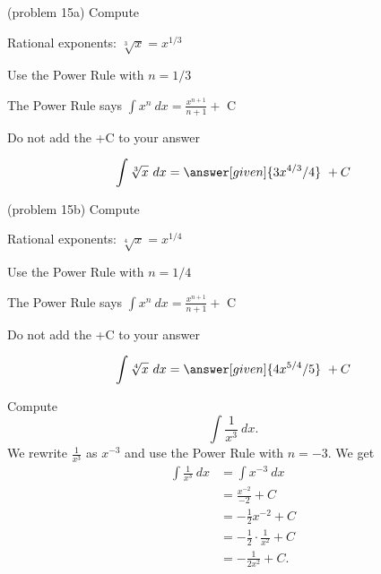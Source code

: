 \documentclass{ximera}
\begin{document}
\begin{problem}(problem 15a)
Compute 

\begin{hint}
Rational exponents: $\sqrt[3]x = x^{1/3}$
\end{hint}
\begin{hint}
Use the Power Rule with $n=1/3$
\end{hint}
\begin{hint}
The Power Rule says $\int x^n \ dx = \frac{x^{n+1}}{n+1} +$ C
\end{hint}
\begin{hint}
\begin{center}
Do not add the +C to your answer
\end{center}
\end{hint}

\[
\int \sqrt[3]x \ dx =
\answer[given]{3x^{4/3} /4} \ + C
\]
\end{problem}


\begin{problem}(problem 15b)
Compute 

\begin{hint}
Rational exponents: $\sqrt[4]x = x^{1/4}$
\end{hint}
\begin{hint}
Use the Power Rule with $n=1/4$
\end{hint}
\begin{hint}
The Power Rule says $\int x^n \ dx = \frac{x^{n+1}}{n+1} +$ C
\end{hint}
\begin{hint}
\begin{center}
Do not add the +C to your answer
\end{center}
\end{hint}

\[
\int \sqrt[4]x \ dx =
\answer[given]{4x^{5/4} /5} \ + C
\]
\end{problem}



\begin{example}[example 16]
Compute $$\int \frac{1}{x^3} \ dx.$$
We rewrite $\frac{1}{x^3}$ as $x^{-3}$ and use the Power Rule with $n= -3$.
We get
\begin{align*}
\int \frac{1}{x^3} \ dx &= \int x^{-3} \ dx \\
&= \frac{x^{-2}}{-2} + C\\ 
&= -\tfrac{1}{2}x^{-2} + C \\
&= -\tfrac{1}{2}\cdot\frac{1}{x^2} + C \\
&= -\frac{1}{2x^2} +C.
\end{align*}
\end{example}
\end{document}

